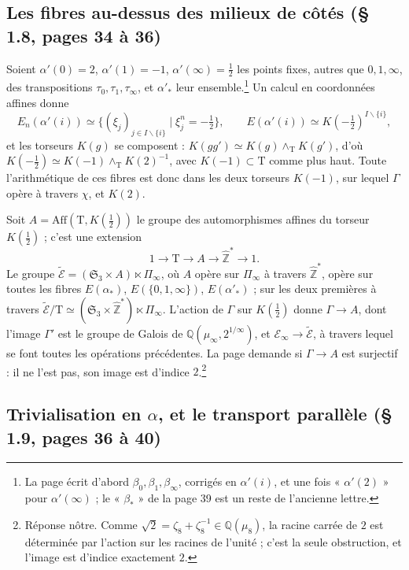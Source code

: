 \documentclass[11pt,a4paper]{article}
\begin{document}
\subsection*{Les fibres au-dessus des milieux de côtés (§ 1.8, pages 34 à 36)}

Soient $\alpha'(0) = 2$, $\alpha'(1) = -1$, $\alpha'(\infty) = \tfrac12$ les
points fixes, autres que $0, 1, \infty$, des transpositions $\tau_{0}, \tau_{1},
\tau_{\infty}$, et $\alpha'_{*}$ leur ensemble.\footnote{La page écrit d'abord
$\beta_{0}, \beta_{1}, \beta_{\infty}$, corrigés en $\alpha'(i)$, et une fois
« $\alpha'(2)$ » pour $\alpha'(\infty)$ ; le « $\beta_{*}$ » de la page 39 est
un reste de l'ancienne lettre.} Un calcul en coordonnées affines donne
\[
E_{n}(\alpha'(i)) \simeq \{(\xi_{j})_{j \in I \smallsetminus \{i\}} \mid
\xi_{j}^{n} = -\tfrac12\}, \qquad
E(\alpha'(i)) \simeq K(-\tfrac12)^{I \smallsetminus \{i\}},
\]
et les torseurs $K(g)$ se composent : $K(gg') \simeq K(g) \wedge_{\mathrm{T}}
K(g')$, d'où $K(-\tfrac12) \simeq K(-1) \wedge_{\mathrm{T}} K(2)^{-1}$, avec
$K(-1) \subset \mathrm{T}$ comme plus haut. Toute l'arithmétique de ces fibres
est donc dans les deux torseurs $K(-1)$, sur lequel $\Gamma$ opère à travers
$\chi$, et $K(2)$.

Soit $A = \mathrm{Aff}(\mathrm{T}, K(\tfrac12))$ le groupe des automorphismes
affines du torseur $K(\tfrac12)$ ; c'est une extension
\[
1 \to \mathrm{T} \to A \to \widehat{\mathbb{Z}}^{*} \to 1 .
\]
Le groupe $\widetilde{\mathcal{E}} = (\mathfrak{S}_{3} \times A) \ltimes
\Pi_{\infty}$, où $A$ opère sur $\Pi_{\infty}$ à travers $\widehat{\mathbb{Z}}^{*}$,
opère sur toutes les fibres $E(\alpha_{*})$, $E(\{0, 1, \infty\})$,
$E(\alpha'_{*})$ ; sur les deux premières à travers $\widetilde{\mathcal{E}}/\mathrm{T}
\simeq (\mathfrak{S}_{3} \times \widehat{\mathbb{Z}}^{*}) \ltimes \Pi_{\infty}$.
L'action de $\Gamma$ sur $K(\tfrac12)$ donne $\Gamma \to A$, dont l'image
$\Gamma'$ est le groupe de Galois de $\mathbb{Q}(\mu_{\infty}, 2^{1/\infty})$, et
$\mathcal{E}_{\infty} \to \widetilde{\mathcal{E}}$, à travers lequel se font
toutes les opérations précédentes. La page demande si $\Gamma \to A$ est
surjectif : il ne l'est pas, son image est d'indice $2$.\footnote{Réponse
nôtre. Comme $\sqrt{2} = \zeta_{8} + \zeta_{8}^{-1} \in \mathbb{Q}(\mu_{8})$, la
racine carrée de $2$ est déterminée par l'action sur les racines de l'unité ;
c'est la seule obstruction, et l'image est d'indice exactement $2$.}

\subsection*{Trivialisation en $\alpha$, et le transport parallèle (§ 1.9,
pages 36 à 40)}
\end{document}
